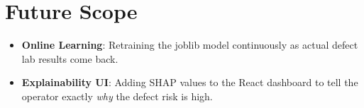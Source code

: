 \documentclass[12pt, a4paper]{article}
\begin{document}
\section{Future Scope}
\begin{itemize}
    \item \textbf{Online Learning}: Retraining the joblib model continuously as actual defect lab results come back.
    \item \textbf{Explainability UI}: Adding SHAP values to the React dashboard to tell the operator exactly \textit{why} the defect risk is high.
\end{itemize}
\end{document}
